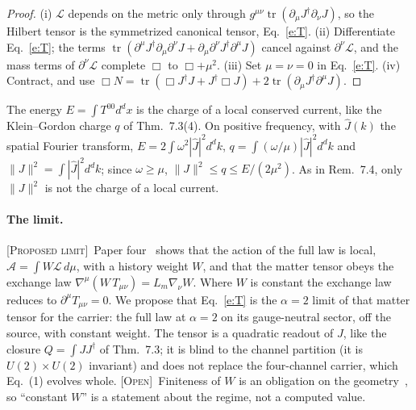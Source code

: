 \documentclass[10pt]{article}
\newcommand{\tr}{\operatorname{tr}}
\theoremstyle{definition}
\newcommand{\ProposedLimit}{\textup{\textsc{[Proposed limit]}}\ }
\newcommand{\Open}{\textup{\textsc{[Open]}}\ }
\begin{document}
\begin{proof}
(i) $\mathcal L$ depends on the metric only through $g^{\mu\nu}\tr(\partial_\mu J^\dagger\partial_\nu J)$, so the Hilbert tensor is the symmetrized canonical tensor, Eq.~\eqref{e:T}. (ii) Differentiate Eq.~\eqref{e:T}; the terms $\tr(\partial^\mu J^\dagger\partial_\mu\partial^\nu J+\partial_\mu\partial^\nu J^\dagger\partial^\mu J)$ cancel against $\partial^\nu\mathcal L$, and the mass terms of $\partial^\nu\mathcal L$ complete $\Box$ to $\Box+\mu^2$. (iii) Set $\mu=\nu=0$ in Eq.~\eqref{e:T}. (iv) Contract, and use $\Box N=\tr(\Box J^\dagger J+J^\dagger\Box J)+2\tr(\partial_\mu J^\dagger\partial^\mu J)$.
\end{proof}

The energy $E=\int T^{00}d^dx$ is the charge of a local conserved current, like the Klein--Gordon charge $q$ of Thm.~7.3(4). On positive frequency, with $\hat J(k)$ the spatial Fourier transform, $E=2\int\omega^2|\hat J|^2d^dk$, $q=\int(\omega/\mu)|\hat J|^2d^dk$ and $\|J\|^2=\int|\hat J|^2d^dk$; since $\omega\ge\mu$, $\|J\|^2\le q\le E/(2\mu^2)$. As in Rem.~7.4, only $\|J\|^2$ is not the charge of a local current.

\paragraph{The limit.} \ProposedLimit Paper four~\cite{varclos} shows that the action of the full law is local, $\mathcal A=\int W\mathcal L\,d\mu$, with a history weight $W$, and that the matter tensor obeys the exchange law $\nabla^\mu(W\,T_{\mu\nu})=L_m\nabla_\nu W$. Where $W$ is constant the exchange law reduces to $\partial^\mu T_{\mu\nu}=0$. We propose that Eq.~\eqref{e:T} is the $\alpha=2$ limit of that matter tensor for the carrier: the full law at $\alpha=2$ on its gauge-neutral sector, off the source, with constant weight. The tensor is a quadratic readout of $J$, like the closure $Q=\int JJ^\dagger$ of Thm.~7.3; it is blind to the channel partition (it is $U(2)\times U(2)$ invariant) and does not replace the four-channel carrier, which Eq.~(1) evolves whole. \Open Finiteness of $W$ is an obligation on the geometry~\cite[Prop.~3.1]{varclos}, so ``constant $W$'' is a statement about the regime, not a computed value.
\end{document}
